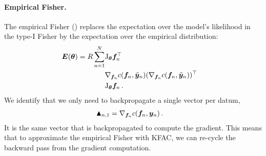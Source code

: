 \paragraph{Empirical Fisher.}
The empirical Fisher () replaces the expectation over the model's likelihood in the type-I Fisher by the expectation over the empirical distribution:
\begin{align*}
  &\begin{aligned}{\bm{E}}({\bm{\theta}}) = R \sum_{n=1}^N
    &\mathrm{J}_{{\bm{\theta}}} {\bm{f}}_n^{\top} \\
                               & \nabla_{{\bm{f}}_n} c({\bm{f}}_n, \tilde{{\bm{y}}}_{n}) (\nabla_{{\bm{f}}_n} c({\bm{f}}_n, \tilde{{\bm{y}}}_n ))^{\top} \\
                               &\mathrm{J}_{{\bm{\theta}}} {\bm{f}}_n\,.
  \end{aligned}
\end{align*}
We identify that we only need to backpropagate a single vector per datum,
\begin{align*}
  \blacktriangle_{n,1}
  &= \nabla_{{\bm{f}}_n}  c({\bm{f}}_n, {\bm{y}}_n)\,.
\end{align*}
It is the same vector that is backpropagated to compute the gradient.
This means that to approximate the empirical Fisher with KFAC, we can re-cycle the backward pass from the gradient computation.
